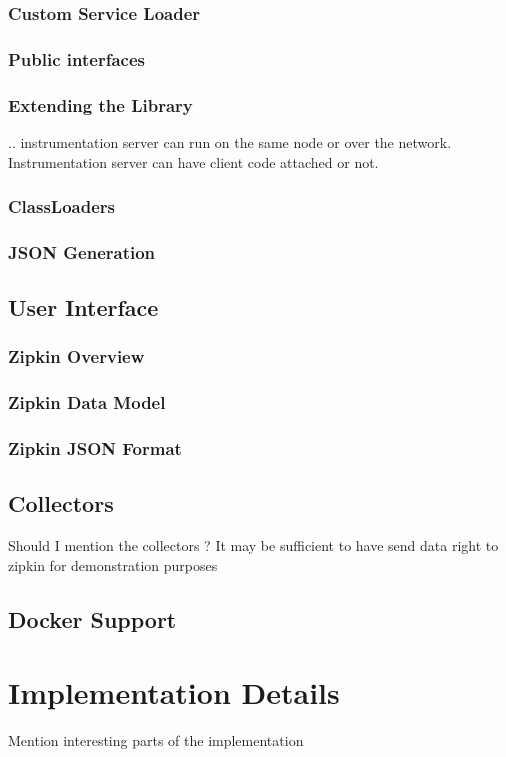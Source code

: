 \documentclass[12pt,a4paper]{report}
\begin{document}
\subsection{Custom Service Loader}
\subsection{Public interfaces}
\subsection{Extending the Library}
.. instrumentation server can run on the same node or over the network. Instrumentation server can have client code attached or not.
\subsection{ClassLoaders}
\subsection{JSON Generation}
\section{User Interface}
\subsection{Zipkin Overview}
\subsection{Zipkin Data Model}
\subsection{Zipkin JSON Format}
\section{Collectors}
Should I mention the collectors ? It may be sufficient to have send data right to zipkin for demonstration purposes
\section{Docker Support}


\chapter{Implementation Details}
Mention interesting parts of the implementation
\end{document}
